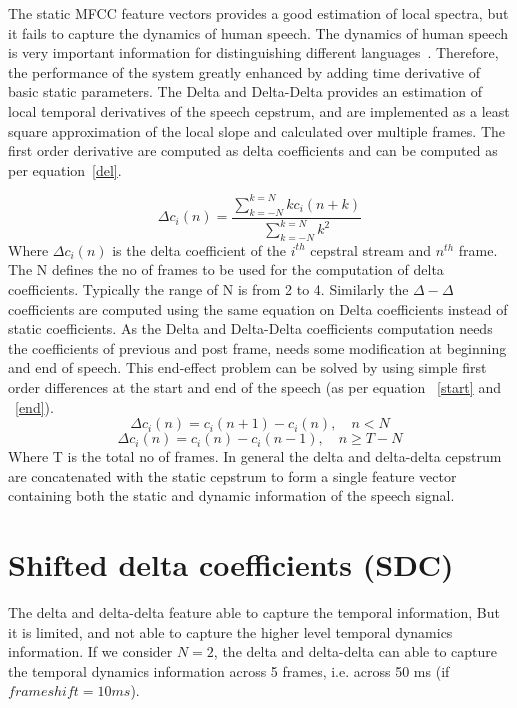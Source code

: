 \begin{spacing}{1.5}
The static MFCC feature vectors provides a good estimation of local spectra, but it fails to capture the dynamics of human speech. The dynamics of human speech is very important information for distinguishing different     languages~\cite{ambikairajah2011language}.  Therefore, the performance of the system greatly enhanced by adding time derivative of basic static parameters. The Delta and Delta-Delta provides an estimation of local temporal derivatives of the speech cepstrum, and are implemented as a least square approximation of the local slope and calculated over multiple frames. The first order derivative are computed as delta coefficients and can be computed as per equation~\ref{del}.

\begin{equation}
\label{del}
    \Delta c_{i}(n)=\frac{\sum _{k=-N}^{k=N}kc_{i}(n+k)}{\sum _{k=-N}^{k=N}k^2}
\end{equation}
Where $\Delta c_{i}(n)$ is the delta coefficient of the $i^{th} $ cepstral stream and $n^{th} $ frame. The N defines the no of frames to be used for the computation of delta coefficients. Typically the range of N is from 2 to 4. Similarly the $\Delta-\Delta$ coefficients are computed using the same equation on Delta coefficients instead of static coefficients. As the Delta and Delta-Delta coefficients computation needs the coefficients of previous and post frame, needs some modification at beginning and end of speech. This end-effect
problem can be solved by using simple first order differences at the start and end of the speech (as per equation ~\ref{start} and ~\ref{end}).
\begin{equation}
\label{start}
    \Delta c_{i}(n)=c_{i}(n+1)-c_{i}(n),\quad n < N
\end{equation}
\vspace{-0.5 cm }
\begin{equation}
\label{end}
    \Delta c_{i}(n)=c_{i}(n)-c_{i}(n-1),\quad n \geq T-N
\end{equation}
Where T is the total no of frames. In general the delta and delta-delta cepstrum are concatenated with the static cepstrum to form a single
feature vector containing both the static and dynamic
information of the speech signal.

\section{Shifted delta coefficients (SDC)}
The delta and delta-delta feature able to capture the temporal information, But it is limited, and not able to capture the higher level temporal dynamics information. If we consider $N=2$, the delta and delta-delta can able to capture the temporal dynamics information across 5 frames, i.e. across 50 ms (if $frameshift=10 ms$).


\end{spacing}
